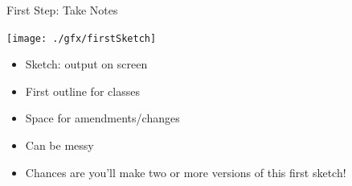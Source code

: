 \begin{frame}{First Step: Take Notes}
%
\begin{center}
	\begin{minipage}{.6\linewidth}
	\texttt{[image: ./gfx/firstSketch]}
	\end{minipage}
	\hspace{1em}
	\begin{minipage}{.35\linewidth}
		\begin{itemize}
		\item Sketch: output on screen
		\item First outline for classes
		\item Space for amendments/changes
		\item Can be messy
		\item Chances are you'll make two or more versions of this first sketch!
		\end{itemize}
	\end{minipage}
\end{center}
%
\end{frame}


